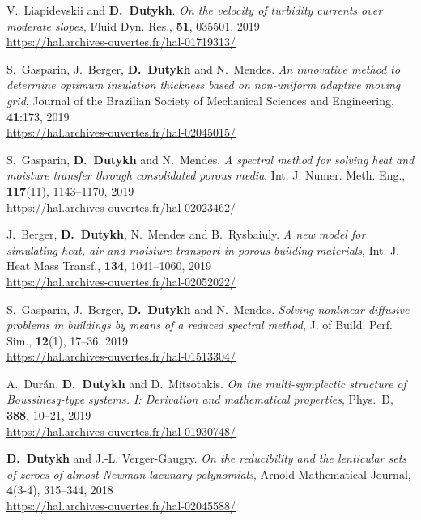 \documentclass[final, a4paper, oneside, 12pt]{article}
\numberwithin{equation}{section}
\begin{document}
\begin{etaremune}
  \item V.~Liapidevskii and \textbf{D.~Dutykh}. \textit{On the velocity of turbidity currents over moderate slopes}, Fluid Dyn. Res., \textbf{51}, 035501, 2019 \\ %
  \url{https://hal.archives-ouvertes.fr/hal-01719313/}
  
  \item S.~Gasparin, J.~Berger, \textbf{D.~Dutykh} and N.~Mendes. \textit{An innovative method to determine optimum insulation thickness based on non-uniform adaptive moving grid}, Journal of the Brazilian Society of Mechanical Sciences and Engineering, \textbf{41}:173, 2019 \\ %
  \url{https://hal.archives-ouvertes.fr/hal-02045015/}
  
  \item S.~Gasparin, \textbf{D.~Dutykh} and N.~Mendes. \textit{A spectral method for solving heat and moisture transfer through consolidated porous media}, Int. J. Numer. Meth. Eng., \textbf{117}(11), 1143--1170, 2019 \\ %
  \url{https://hal.archives-ouvertes.fr/hal-02023462/}
  
  \item J.~Berger, \textbf{D.~Dutykh}, N.~Mendes and B.~Rysbaiuly. \textit{A new model for simulating heat, air and moisture transport in porous building materials}, Int. J. Heat Mass Transf., \textbf{134}, 1041--1060, 2019 \\ %
  \url{https://hal.archives-ouvertes.fr/hal-02052022/}
  
  \item S.~Gasparin, J.~Berger, \textbf{D.~Dutykh} and N.~Mendes. \textit{Solving nonlinear diffusive problems in buildings by means of a reduced spectral method}, J. of Build. Perf. Sim., \textbf{12}(1), 17--36, 2019 \\ %
  \url{https://hal.archives-ouvertes.fr/hal-01513304/}
  
  \item A.~Dur\'an, \textbf{D.~Dutykh} and D.~Mitsotakis. \textit{On the multi-symplectic structure of Boussinesq-type systems. I: Derivation and mathematical properties}, Phys.~D, \textbf{388}, 10--21, 2019 \\ %
  \url{https://hal.archives-ouvertes.fr/hal-01930748/}

  
  \item \textbf{D.~Dutykh} and J.-L. Verger-Gaugry. \textit{On the reducibility and the lenticular sets of zeroes of almost Newman lacunary polynomials}, Arnold Mathematical Journal, \textbf{4}(3-4), 315--344, 2018 \\ %
  \url{https://hal.archives-ouvertes.fr/hal-02045588/}
  

\end{etaremune}
\end{document}
